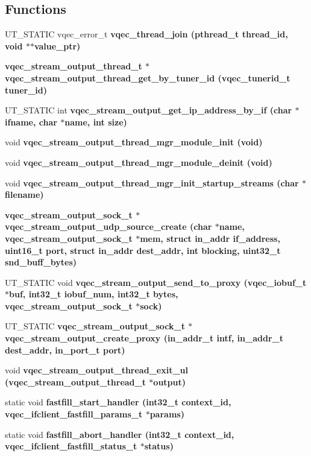\subsection*{Functions}
\begin{CompactItemize}
\item 
UT\_\-STATIC vqec\_\-error\_\-t \bf{vqec\_\-thread\_\-join} (pthread\_\-t thread\_\-id, void $\ast$$\ast$value\_\-ptr)
\item 
\bf{vqec\_\-stream\_\-output\_\-thread\_\-t} $\ast$ \bf{vqec\_\-stream\_\-output\_\-thread\_\-get\_\-by\_\-tuner\_\-id} (vqec\_\-tunerid\_\-t tuner\_\-id)
\item 
UT\_\-STATIC int \bf{vqec\_\-stream\_\-output\_\-get\_\-ip\_\-address\_\-by\_\-if} (char $\ast$ifname, char $\ast$name, int size)
\item 
void \bf{vqec\_\-stream\_\-output\_\-thread\_\-mgr\_\-module\_\-init} (void)
\item 
void \bf{vqec\_\-stream\_\-output\_\-thread\_\-mgr\_\-module\_\-deinit} (void)
\item 
void \bf{vqec\_\-stream\_\-output\_\-thread\_\-mgr\_\-init\_\-startup\_\-streams} (char $\ast$\bf{filename})
\item 
\bf{vqec\_\-stream\_\-output\_\-sock\_\-t} $\ast$ \bf{vqec\_\-stream\_\-output\_\-udp\_\-source\_\-create} (char $\ast$name, \bf{vqec\_\-stream\_\-output\_\-sock\_\-t} $\ast$mem, struct in\_\-addr if\_\-address, uint16\_\-t port, struct in\_\-addr dest\_\-addr, int blocking, uint32\_\-t snd\_\-buff\_\-bytes)
\item 
UT\_\-STATIC void \bf{vqec\_\-stream\_\-output\_\-send\_\-to\_\-proxy} (vqec\_\-iobuf\_\-t $\ast$buf, int32\_\-t iobuf\_\-num, int32\_\-t bytes, \bf{vqec\_\-stream\_\-output\_\-sock\_\-t} $\ast$sock)
\item 
UT\_\-STATIC \bf{vqec\_\-stream\_\-output\_\-sock\_\-t} $\ast$ \bf{vqec\_\-stream\_\-output\_\-create\_\-proxy} (in\_\-addr\_\-t intf, in\_\-addr\_\-t dest\_\-addr, in\_\-port\_\-t port)
\item 
void \bf{vqec\_\-stream\_\-output\_\-thread\_\-exit\_\-ul} (\bf{vqec\_\-stream\_\-output\_\-thread\_\-t} $\ast$output)
\item 
static void \bf{fastfill\_\-start\_\-handler} (int32\_\-t context\_\-id, \bf{vqec\_\-ifclient\_\-fastfill\_\-params\_\-t} $\ast$params)
\item 
static void \bf{fastfill\_\-abort\_\-handler} (int32\_\-t context\_\-id, \bf{vqec\_\-ifclient\_\-fastfill\_\-status\_\-t} $\ast$status)
\item 
$$
\end{CompactItemize}
